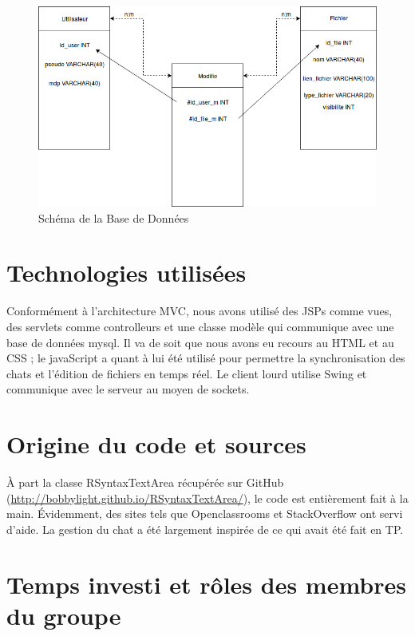 \documentclass[a4paper, 12pt]{article}
\begin{document}
\begin{figure}[H]
  \begin{center}
    \includegraphics[scale=0.4]{entite_association.png}
  \end{center}
  \caption{Schéma de la Base de Données}
\end{figure}


\section{Technologies utilisées}

Conformément à l'architecture MVC, nous avons utilisé des JSPs comme vues, des servlets comme controlleurs et une classe modèle qui communique avec une base de données mysql. Il va de soit que nous avons eu recours au HTML et au CSS ; le javaScript a quant à lui été utilisé pour permettre la synchronisation des chats et l'édition de fichiers en temps réel. Le client lourd utilise Swing et communique avec le serveur au moyen de sockets.


\section{Origine du code et sources}

À part la classe RSyntaxTextArea récupérée sur GitHub (\url{http://bobbylight.github.io/RSyntaxTextArea/}), le code est entièrement fait à la main. Évidemment, des sites tels que Openclassrooms et StackOverflow ont servi d'aide. La gestion du chat a été largement inspirée de ce qui avait été fait en TP.

\section{Temps investi et rôles des membres du groupe}
\end{document}
